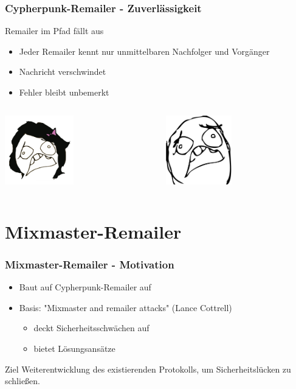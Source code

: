 \documentclass{beamer}
\begin{document}
\begin{frame}
	\frametitle{Cypherpunk-Remailer - Zuverlässigkeit}
	\begin{alertblock}{Remailer im Pfad fällt aus}	
		\begin{itemize}	
			\item Jeder Remailer kennt nur unmittelbaren Nachfolger und Vorgänger
			\item Nachricht verschwindet
			\item Fehler bleibt unbemerkt
		\end{itemize}	
	\end{alertblock}


	\begin{columns}[T]
		\begin{column}[T]{5cm}
			\begin{center}
				\includegraphics[height=3cm]{bilder/alice_sad.jpg}
			\end{center}
		\end{column}
		\begin{column}[T]{5cm}
			\begin{center}	
				\includegraphics[height=3cm]{bilder/bob_sad.jpg}
			\end{center}
		\end{column}
	\end{columns}	
\end{frame}

\section{Mixmaster-Remailer}

\begin{frame}
	\frametitle{Mixmaster-Remailer - Motivation}
	\begin{itemize}
		\item Baut auf Cypherpunk-Remailer auf
		\item Basis: "Mixmaster and remailer attacks" (Lance Cottrell)
		\begin{itemize}	
			\item deckt Sicherheitsschwächen auf
			\item bietet Lösungsansätze
		\end{itemize}
	\end{itemize}

	\begin{exampleblock}{Ziel}
		\centering
		Weiterentwicklung des existierenden Protokolls, um Sicherheitslücken zu schließen.
	\end{exampleblock}
\end{frame}
\end{document}
